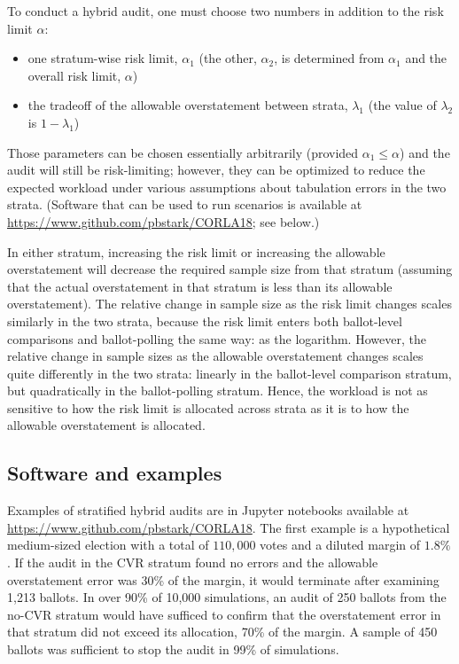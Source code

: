 \documentclass[12pt]{article}
\begin{document}
To conduct a hybrid audit, one must choose two numbers
in addition to the risk limit $\alpha$:
\begin{itemize}
   \item one stratum-wise risk limit, $\alpha_1$ 
(the other, $\alpha_2$, is determined from $\alpha_1$ and the overall risk limit, $\alpha$)
   \item the tradeoff of the allowable overstatement between strata, $\lambda_1$
(the value of $\lambda_2$ is $1-\lambda_1$)
\end{itemize}
Those parameters can be chosen essentially arbitrarily (provided $\alpha_1 \le \alpha$)
and the audit will still be risk-limiting;
however, they can be optimized to reduce the expected workload under various
assumptions about tabulation errors in the two strata.
(Software that can be used to run scenarios is available at 
\url{https://www.github.com/pbstark/CORLA18}; see below.)

In either stratum, increasing the risk limit or increasing the allowable overstatement will decrease
the required sample size from that stratum (assuming that the actual overstatement in
that stratum is less than its allowable overstatement).
The relative change in sample size as the risk limit changes scales similarly in the two strata, 
because the risk limit 
enters both ballot-level comparisons and ballot-polling the same way: as the logarithm.
However, the relative change in sample sizes as the allowable overstatement changes
scales quite differently in the two strata: linearly in the ballot-level comparison stratum,
but quadratically in the ballot-polling stratum.
Hence, the workload is not as sensitive to how the risk limit is allocated across strata
as it is to how the allowable overstatement is allocated.

\subsection{Software and examples}
Examples of stratified hybrid audits are in Jupyter notebooks available
at \url{https://www.github.com/pbstark/CORLA18}.
The first example is a hypothetical medium-sized election with a total of 
$110,000$ votes and a diluted margin of $1.8\%$.
If the audit in the CVR stratum found no errors and the allowable overstatement error was 30\% of the margin, 
it would terminate after examining 1,213 ballots.
In over 90\% of 10,000 simulations, an audit of 250 ballots from the no-CVR stratum
would have sufficed to confirm that the overstatement error in that stratum
did not exceed its allocation, 70\% of the margin.
A sample of 450 ballots was sufficient to stop the audit in 99\% of simulations.
\end{document}
